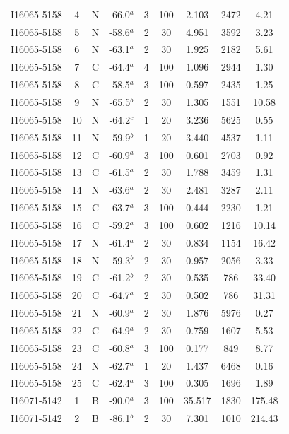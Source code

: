 \begin{table}
\begin{tabular}{ccccccccc}
I16065-5158 & 4 & N & -66.0$^{a}$ & 3 & 100 & 2.103 & 2472 & 4.21 \\
I16065-5158 & 5 & N & -58.6$^{a}$ & 2 & 30 & 4.951 & 3592 & 3.23 \\
I16065-5158 & 6 & N & -63.1$^{a}$ & 2 & 30 & 1.925 & 2182 & 5.61 \\
I16065-5158 & 7 & C & -64.4$^{a}$ & 4 & 100 & 1.096 & 2944 & 1.30 \\
I16065-5158 & 8 & C & -58.5$^{a}$ & 3 & 100 & 0.597 & 2435 & 1.25 \\
I16065-5158 & 9 & N & -65.5$^{b}$ & 2 & 30 & 1.305 & 1551 & 10.58 \\
I16065-5158 & 10 & N & -64.2$^{c}$ & 1 & 20 & 3.236 & 5625 & 0.55 \\
I16065-5158 & 11 & N & -59.9$^{b}$ & 1 & 20 & 3.440 & 4537 & 1.11 \\
I16065-5158 & 12 & C & -60.9$^{a}$ & 3 & 100 & 0.601 & 2703 & 0.92 \\
I16065-5158 & 13 & C & -61.5$^{a}$ & 2 & 30 & 1.788 & 3459 & 1.31 \\
I16065-5158 & 14 & N & -63.6$^{a}$ & 2 & 30 & 2.481 & 3287 & 2.11 \\
I16065-5158 & 15 & C & -63.7$^{a}$ & 3 & 100 & 0.444 & 2230 & 1.21 \\
I16065-5158 & 16 & C & -59.2$^{a}$ & 3 & 100 & 0.602 & 1216 & 10.14 \\
I16065-5158 & 17 & N & -61.4$^{a}$ & 2 & 30 & 0.834 & 1154 & 16.42 \\
I16065-5158 & 18 & N & -59.3$^{b}$ & 2 & 30 & 0.957 & 2056 & 3.33 \\
I16065-5158 & 19 & C & -61.2$^{b}$ & 2 & 30 & 0.535 & 786 & 33.40 \\
I16065-5158 & 20 & C & -64.7$^{a}$ & 2 & 30 & 0.502 & 786 & 31.31 \\
I16065-5158 & 21 & N & -60.9$^{a}$ & 2 & 30 & 1.876 & 5976 & 0.27 \\
I16065-5158 & 22 & C & -64.9$^{a}$ & 2 & 30 & 0.759 & 1607 & 5.53 \\
I16065-5158 & 23 & C & -60.8$^{a}$ & 3 & 100 & 0.177 & 849 & 8.77 \\
I16065-5158 & 24 & N & -62.7$^{a}$ & 1 & 20 & 1.437 & 6468 & 0.16 \\
I16065-5158 & 25 & C & -62.4$^{a}$ & 3 & 100 & 0.305 & 1696 & 1.89 \\
I16071-5142 & 1 & B & -90.0$^{a}$ & 3 & 100 & 35.517 & 1830 & 175.48 \\
I16071-5142 & 2 & B & -86.1$^{b}$ & 2 & 30 & 7.301 & 1010 & 214.43 \\

\end{tabular}
\end{table}
